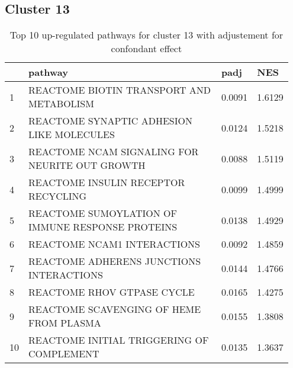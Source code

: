 \documentclass{article}
\begin{document}
\subsection{Cluster 13 }
\begin{table}[H]
\centering
\begin{tabular}{p{0.05\linewidth}p{0.7\linewidth}p{0.1\linewidth}p{0.1\linewidth}}
  \hline
 & pathway & padj & NES \\ 
  \hline
1 & REACTOME BIOTIN TRANSPORT AND METABOLISM & 0.0091 & 1.6129 \\ 
  2 & REACTOME SYNAPTIC ADHESION LIKE MOLECULES & 0.0124 & 1.5218 \\ 
  3 & REACTOME NCAM SIGNALING FOR NEURITE OUT GROWTH & 0.0088 & 1.5119 \\ 
  4 & REACTOME INSULIN RECEPTOR RECYCLING & 0.0099 & 1.4999 \\ 
  5 & REACTOME SUMOYLATION OF IMMUNE RESPONSE PROTEINS & 0.0138 & 1.4929 \\ 
  6 & REACTOME NCAM1 INTERACTIONS & 0.0092 & 1.4859 \\ 
  7 & REACTOME ADHERENS JUNCTIONS INTERACTIONS & 0.0144 & 1.4766 \\ 
  8 & REACTOME RHOV GTPASE CYCLE & 0.0165 & 1.4275 \\ 
  9 & REACTOME SCAVENGING OF HEME FROM PLASMA & 0.0155 & 1.3808 \\ 
  10 & REACTOME INITIAL TRIGGERING OF COMPLEMENT & 0.0135 & 1.3637 \\ 
   \hline
\end{tabular}
\caption{Top 10 up-regulated pathways for cluster 13 with adjustement for confondant effect} 
\label{tab:q3_2_conf_13}
\end{table}
\end{document}
